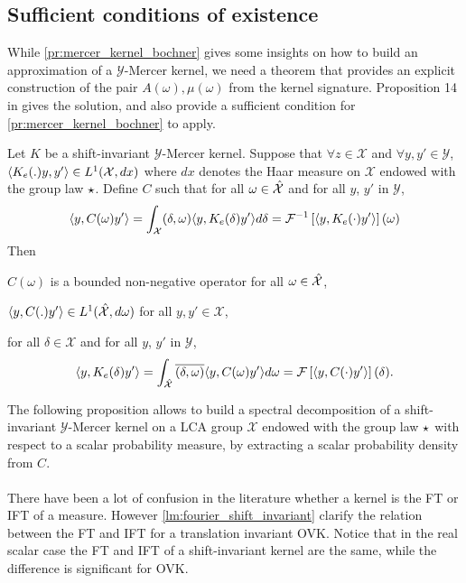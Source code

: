 \subsection{Sufficient conditions of existence}
\label{subsec:sufficient_conditions}
While \cref{pr:mercer_kernel_bochner} gives some insights on how to build an approximation of a $\mathcal{Y}$-Mercer kernel, we need a theorem that provides an explicit construction of the pair $A(\omega), \mu(\omega)$ from the kernel signature. Proposition 14 in \citet{Carmeli2010} gives the solution, and also provide a sufficient condition for \cref{pr:mercer_kernel_bochner} to apply.
\begin{proposition}
\label{pr:inverse_ovk_Fourier_decomposition}
Let $K$ be a shift-invariant $\mathcal{Y}$-Mercer kernel. %
Suppose that $\forall z \in \mathcal{X}$ and $\forall y ,y' \in\mathcal{Y}$, $\langle K_e(.)y,y'\rangle\in L^1(\mathcal{X},dx)$ where $dx$ denotes the Haar measure on $\mathcal{X}$ endowed with the group law $\star$. %
Define $C$ such that for all $\omega \in \hat{\mathcal{X}}$ and for all $y$, $y'$ in $\mathcal{Y}$,
\begin{dmath}\label{eq:CK0}
\inner{y,C(\omega)y'} = \int_{\mathcal{X}} \pairing{\delta, \omega}\inner{y, K_e(\delta)y'}d\delta = \IFT{\inner{y, K_e(\cdot)y'}}(\omega)
\end{dmath}
Then
\begin{propenum}
\item $C(\omega)$ is a bounded non-negative operator for all $\omega \in \hat{\mathcal{X}}$,
\item $\langle y, C(.)y'\rangle\in L^1(\hat{\mathcal{X}},d\omega)$ for all $y,y'\in\mathcal{X}$,
\item for all $\delta\in\mathcal{X}$ and for all $y$, $y'$ in $\mathcal{Y}$,
\begin{dmath*}
\inner{y, K_e(\delta)y'}= \int_{\dual{\mathcal{X}}}\conj{\pairing{\delta,\omega}}\inner{y, C(\omega)y'}d\omega
=\FT{\inner{y, C(\cdot)y'}}(\delta).
\end{dmath*}
\end{propenum}
\end{proposition}
The following proposition allows to build a spectral decomposition of a shift-invariant $\mathcal{Y}$-Mercer kernel on a \acs{LCA} group $\mathcal{X}$ endowed with the group law $\star$ with respect to a scalar probability measure, by extracting a scalar probability density from $C$.
\paragraph{}
There have been a lot of confusion in the literature whether a kernel is the \acl{FT} or \acl{IFT} of a measure. However \cref{lm:fourier_shift_invariant} clarify the relation between the \acl{FT} and \acl{IFT} for a translation invariant \acl{OVK}. Notice that in the real scalar case the \acl{FT} and \acl{IFT} of a shift-invariant kernel are the same, while the difference is significant for \acs{OVK}.
